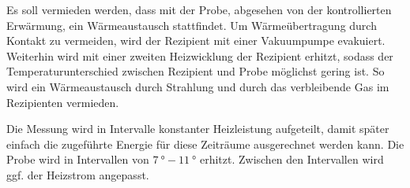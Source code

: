 Es soll vermieden werden, dass mit der Probe, abgesehen von der kontrollierten Erwärmung, ein Wärmeaustausch stattfindet.
Um Wärmeübertragung durch Kontakt zu vermeiden, wird der Rezipient mit einer Vakuumpumpe evakuiert.
Weiterhin wird mit einer zweiten Heizwicklung der Rezipient erhitzt, sodass der Temperaturunterschied zwischen Rezipient und Probe möglichst gering ist.
So wird ein Wärmeaustausch durch Strahlung und durch das verbleibende Gas im Rezipienten vermieden.

Die Messung wird in Intervalle konstanter Heizleistung aufgeteilt, damit später einfach die zugeführte Energie für diese Zeiträume ausgerechnet werden kann.
Die Probe wird in Intervallen von $\SI{7}{\degree} - \SI{11}{\degree}$ erhitzt.
Zwischen den Intervallen wird ggf. der Heizstrom angepasst.